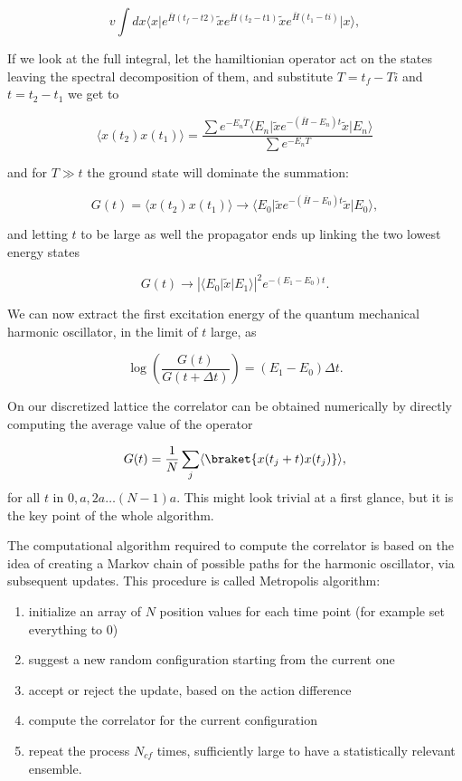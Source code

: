 \documentclass[%
oneside,                 %
final,                   %
10pt]{article}
\begin{document}
\[	
v	\int dx \langle x\vert  e^{\bar{H}(t_f-t2)} \tilde{x} e^{\bar{H}(t_2-t1)} \tilde{x} e^{\bar{H}(t_1-ti)} \vert x\rangle,
\]

If we look at the full integral, let the hamiltionian operator act on
the states leaving the spectral decomposition of them, and substitute
$T = t_f-Ti$ and $t = t_2 - t_1$ we get to

\[
	\langle x(t_2)x(t_1) \rangle = \frac{\sum e^{-E_n T} \langle E_n\vert \tilde{x} e^{-(\bar{H}-E_n)t}  \tilde{x}\vert E_n\rangle }{\sum e^{-E_n T }}
\]

and for $T \gg t$ the ground state will dominate the summation:

\[
	G(t) = \langle x(t_2)x(t_1)\rangle \rightarrow  \langle E_0\vert \tilde{x} e^{-(\bar{H}-E_0)t}  \tilde{x}\vert E_0\rangle,
\]

and letting $t$ to be large as well the propagator ends up linking the two lowest energy states

\[
	G(t) \rightarrow  |\langle E_0\vert \tilde{x} \vert E_1\rangle|^2e^{-(E_1-E_0)t}.
\]

We can now extract the first excitation energy of the quantum mechanical harmonic oscillator, in the limit of $t$ large, as

\[
	\log\left( \frac{G(t)}{G(t+\Delta t)}\right) = (E_1 - E_0)\Delta t.
\]

On our discretized lattice the correlator can be obtained numerically by directly computing the average value of the operator

\[
	G(t) = \frac{1}{N}\sum_j\langle\braket{x(t_j+t)x(t_j)}\rangle,
\]
for all $t$ in $0, a, 2a\dots (N-1)a$. This might look trivial at a first glance, but it is the key point of the whole algorithm.

The computational algorithm required to compute the correlator is
based on the idea of creating a Markov chain of possible paths for the
harmonic oscillator, via subsequent updates. This procedure is called
Metropolis algorithm:

\begin{enumerate}
\item initialize an array of $N$ position values for each time point (for example set everything to 0)

\item suggest a new random configuration starting from the current one

\item accept or reject the update, based on the action difference

\item compute the correlator for the current configuration

\item repeat the process $N_{cf}$ times, sufficiently large to have a statistically relevant ensemble.
\end{enumerate}
\end{document}

